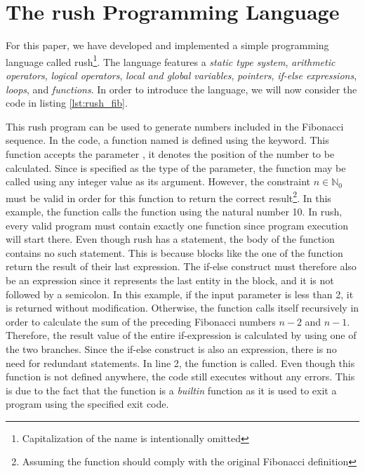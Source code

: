 \newpage %
\section{The rush Programming Language}

For this paper, we have developed and implemented a simple programming language called rush\footnote{Capitalization of the name is intentionally omitted}.
The language features a \emph{static type system}, \emph{arithmetic operators}, \emph{logical operators}, \emph{local and global variables}, \emph{pointers}, \emph{if-else expressions}, \emph{loops}, and \emph{functions}.
In order to introduce the language, we will now consider the code in listing \ref{lst:rush_fib}.


This rush program can be used to generate numbers included in the Fibonacci sequence.
In the code, a function named  is defined using the  keyword.
This function accepts the parameter , it denotes the position of the number to be calculated.
Since  is specified as the type of the parameter, the function may be called using any integer value as its argument.
However, the constraint $n \in \mathbb{N}_0$ must be valid in order for this function to return the correct result\footnote{Assuming the function should comply with the original Fibonacci definition}.
In this example, the  function calls the  function using the natural number 10.
In rush, every valid program must contain exactly one  function since program execution will start there.
Even though rush has a  statement, the body of the  function contains no such statement.
This is because blocks like the one of the function  return the result of their last expression.
The if-else construct must therefore also be an expression since it represents the last entity in the block, and it is not followed by a semicolon.
In this example, if the input parameter  is less than 2, it is returned without modification.
Otherwise, the function calls itself recursively in order to calculate the sum of the preceding Fibonacci numbers $n - 2$ and $n - 1$.
Therefore, the result value of the entire if-expression is calculated by using one of the two branches.
Since the if-else construct is also an expression, there is no need for redundant  statements.
In line 2, the  function is called.
Even though this function is not defined anywhere, the code still executes without any errors.
This is due to the fact that the  function is a \emph{builtin} function as it is used to exit a program using the specified exit code.


